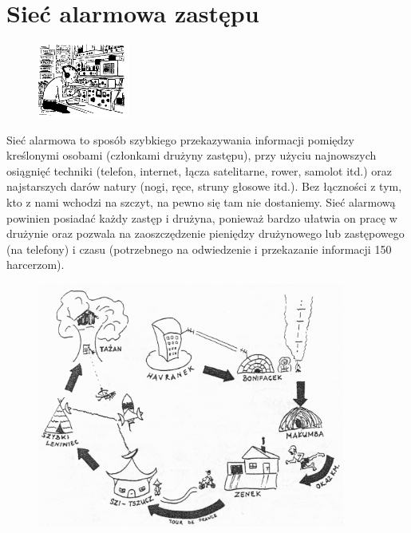 \section{Sieć alarmowa zastępu}
\begin{figure}
\begin{center}
\includegraphics[width=3cm]{grafiki/nasluch.png}
\end{center}
\end{figure}Sieć alarmowa to sposób szybkiego przekazywania informacji pomiędzy kreślonymi osobami (członkami drużyny zastępu), przy użyciu najnowszych osiągnięć techniki (telefon, internet, łącza satelitarne, rower, samolot  itd.) oraz najstarszych darów natury (nogi, ręce, struny głosowe itd.). Bez łączności z tym, kto z nami wchodzi na szczyt, na pewno się tam nie dostaniemy. Sieć alarmową powinien posiadać każdy zastęp i drużyna, ponieważ bardzo ułatwia on pracę w drużynie oraz pozwala na zaoszczędzenie pieniędzy drużynowego lub zastępowego (na  telefony)  i czasu (potrzebnego na odwiedzenie i przekazanie informacji 150 harcerzom).

\begin{figure}[h]
\begin{center}
\includegraphics[width=0.9\textwidth]{grafiki/siec.png}
\end{center}
\end{figure}


